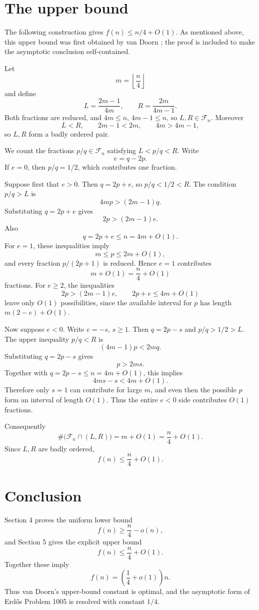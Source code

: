 \documentclass[11pt]{article}
\numberwithin{equation}{section}
\theoremstyle{definition}
\theoremstyle{remark}
\newcommand{\Fn}{\mathcal F_n}
\newcommand{\1}{\mathbf 1}
\begin{document}
\section{The upper bound}

The following construction gives $f(n)\le n/4+O(1)$.  As mentioned above, this upper bound was first obtained by van Doorn \cite{vanDoorn2025}; the proof is included to make the asymptotic conclusion self-contained.

Let
\[
  m=\left\lfloor\frac n4\right\rfloor
\]
and define
\[
  L=\frac{2m-1}{4m},
  \qquad
  R=\frac{2m}{4m-1}.
\]
Both fractions are reduced, and $4m\le n$, $4m-1\le n$, so $L,R\in\Fn$.  Moreover
\[
  L<R,
  \qquad 2m-1<2m,
  \qquad 4m>4m-1,
\]
so $L,R$ form a badly ordered pair.

We count the fractions $p/q\in\Fn$ satisfying $L<p/q<R$.  Write
\[
  e=q-2p.
\]
If $e=0$, then $p/q=1/2$, which contributes one fraction.

Suppose first that $e>0$.  Then $q=2p+e$, so $p/q<1/2<R$.  The condition $p/q>L$ is
\[
  4mp>(2m-1)q.
\]
Substituting $q=2p+e$ gives
\[
  2p>(2m-1)e.
\]
Also
\[
  q=2p+e\le n=4m+O(1).
\]
For $e=1$, these inequalities imply
\[
  m\le p\le2m+O(1),
\]
and every fraction $p/(2p+1)$ is reduced.  Hence $e=1$ contributes
\[
  m+O(1)=\frac n4+O(1)
\]
fractions.  For $e\ge2$, the inequalities
\[
  2p>(2m-1)e,
  \qquad
  2p+e\le4m+O(1)
\]
leave only $O(1)$ possibilities, since the available interval for $p$ has length $m(2-e)+O(1)$.

Now suppose $e<0$.  Write $e=-s$, $s\ge1$.  Then $q=2p-s$ and $p/q>1/2>L$.  The upper inequality $p/q<R$ is
\[
  (4m-1)p<2mq.
\]
Substituting $q=2p-s$ gives
\[
  p>2ms.
\]
Together with $q=2p-s\le n=4m+O(1)$, this implies
\[
  4ms-s<4m+O(1).
\]
Therefore only $s=1$ can contribute for large $m$, and even then the possible $p$ form an interval of length $O(1)$.  Thus the entire $e<0$ side contributes $O(1)$ fractions.

Consequently
\[
  \#\bigl(\Fn\cap(L,R)\bigr)=m+O(1)=\frac n4+O(1).
\]
Since $L,R$ are badly ordered,
\[
  f(n)\le \frac n4+O(1).
\]

\section{Conclusion}

Section 4 proves the uniform lower bound
\[
  f(n)\ge \frac n4-o(n),
\]
and Section 5 gives the explicit upper bound
\[
  f(n)\le \frac n4+O(1).
\]
Together these imply
\[
  f(n)=\left(\frac14+o(1)\right)n.
\]
Thus van Doorn's upper-bound constant is optimal, and the asymptotic form of Erdős Problem 1005 is resolved with constant $1/4$.
\end{document}
